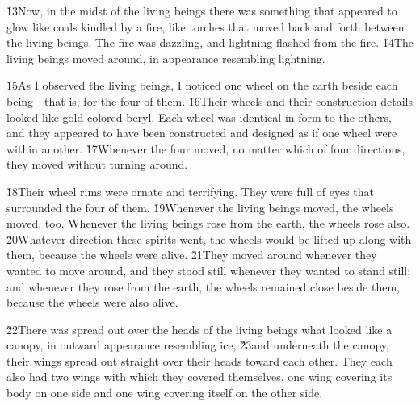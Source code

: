 \v{13}Now, in the midst of the living beings there was something that appeared to glow like coals kindled by a fire, like torches that moved back and forth between the living beings. The fire was dazzling, and lightning flashed from the fire. \v{14}The living beings moved around, in appearance resembling lightning.

\v{15}As I observed the living beings, I noticed one wheel on the earth beside each being---that is, for the four of them. \v{16}Their wheels and their construction details looked like gold-colored beryl. Each wheel was identical in form to the others, and they appeared to have been constructed and designed as if one wheel were within another. \v{17}Whenever the four moved, no matter which of four directions, they moved without turning around.

\v{18}Their wheel rims were ornate and terrifying. They were full of eyes that surrounded the four of them. \v{19}Whenever the living beings moved, the wheels moved, too. Whenever the living beings rose from the earth, the wheels rose also. \v{20}Whatever direction these spirits went, the wheels would be lifted up along with them, because the wheels were alive. \v{21}They moved around whenever they wanted to move around, and they stood still whenever they wanted to stand still; and whenever they rose from the earth, the wheels remained close beside them, because the wheels were also alive.

\v{22}There was spread out over the heads of the living beings what looked like a canopy, in outward appearance resembling ice, \v{23}and underneath the canopy, their wings spread out straight over their heads toward each other. They each also had two wings with which they covered themselves, one wing covering its body on one side and one wing covering itself on the other side.

